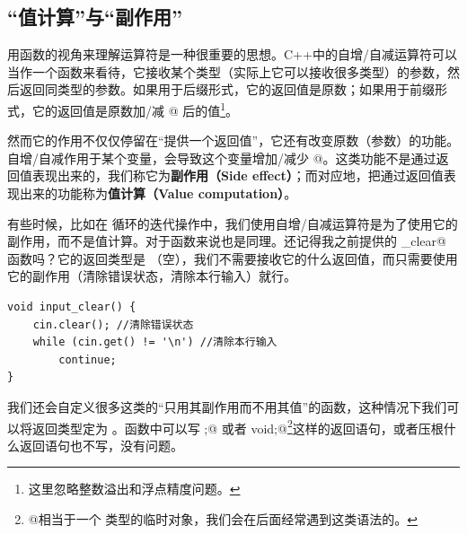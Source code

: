 \subsection*{``值计算''与``副作用''}
用函数的视角来理解运算符是一种很重要的思想。C++中的自增/自减运算符可以当作一个函数来看待，它接收某个类型（实际上它可以接收很多类型）的参数，然后返回同类型的参数。如果用于后缀形式，它的返回值是原数；如果用于前缀形式，它的返回值是原数加/减 @ 后的值\footnote{这里忽略整数溢出和浮点精度问题。}。\par
然而它的作用不仅仅停留在``提供一个返回值''，它还有改变原数（参数）的功能。自增/自减作用于某个变量，会导致这个变量增加/减少 @。这类功能不是通过返回值表现出来的，我们称它为\textbf{副作用（Side effect）}；而对应地，把通过返回值表现出来的功能称为\textbf{值计算（Value computation）}。\par
有些时候，比如在 \lstinline@for@ 循环的迭代操作中，我们使用自增/自减运算符是为了使用它的副作用，而不是值计算。对于函数来说也是同理。还记得我之前提供的 \lstinline@input_clear@ 函数吗？它的返回类型是 \lstinline@void@（空），我们不需要接收它的什么返回值，而只需要使用它的副作用（清除错误状态，清除本行输入）就行。
\begin{lstlisting}
void input_clear() {
    cin.clear(); //清除错误状态
    while (cin.get() != '\n') //清除本行输入
        continue;
}
\end{lstlisting}
我们还会自定义很多这类的``只用其副作用而不用其值''的函数，这种情况下我们可以将返回类型定为 \lstinline@void@。\lstinline@void@ 函数中可以写 \lstinline@return ;@ 或者 \lstinline@return void{};@\footnote{\lstinline@void{}@相当于一个 \lstinline@void@ 类型的临时对象，我们会在后面经常遇到这类语法的。}这样的返回语句，或者压根什么返回语句也不写，没有问题。\par
